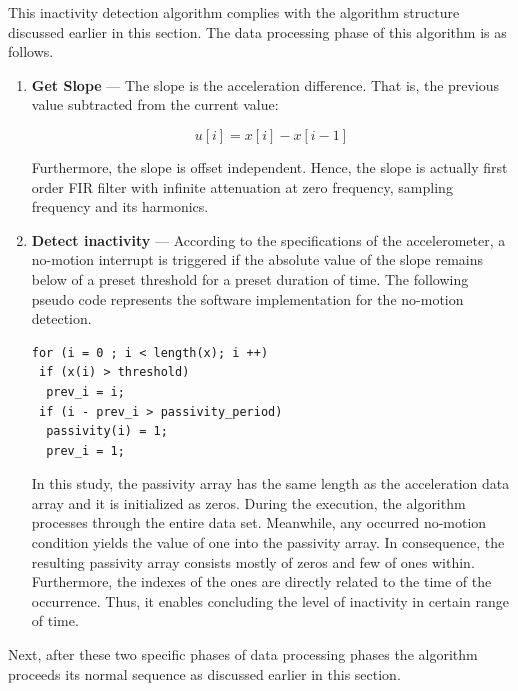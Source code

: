 \documentclass[english,12pt,a4paper,pdftex,elec,utf8]{aaltothesis}
\newcommand{\Clanguage}{\lstset{
  language=C++,                %
  basicstyle=\ttfamily,
  title=\lstname,                 %
}}
\begin{document}
This inactivity detection algorithm complies with the algorithm structure discussed earlier in this section. The data processing phase of this algorithm is as follows. \\

\begin{enumerate}
\item \textbf{Get Slope} --- The slope is the acceleration difference. That is, the previous value subtracted from the current value: 

\begin{equation}
u[i] = x[i] - x[i-1]
\end{equation}

Furthermore, the slope is offset independent. Hence, the slope is actually first order FIR filter with infinite attenuation at zero frequency, sampling frequency and its harmonics. \\

\item \textbf{Detect inactivity} --- According to the specifications of the accelerometer, a no-motion interrupt is triggered if the absolute value of the slope remains below of a preset threshold for a preset duration of time. The following pseudo code represents the software implementation for the no-motion detection. \\

\Clanguage
\begin{lstlisting}
for (i = 0 ; i < length(x); i ++)
 if (x(i) > threshold)	
  prev_i = i;
 if (i - prev_i > passivity_period)
  passivity(i) = 1;
  prev_i = 1;	
\end{lstlisting}

In this study, the passivity array has the same length as the acceleration data array and it is initialized as zeros. During the execution, the algorithm processes through the entire data set. Meanwhile, any occurred no-motion condition yields the value of one into the passivity array. In consequence, the resulting passivity array consists mostly of zeros and few of ones within. Furthermore, the indexes of the ones are directly related to the time of the occurrence. Thus, it enables concluding the level of inactivity in certain range of time. \\

\end{enumerate}

Next, after these two specific phases of data processing phases the algorithm proceeds its normal sequence as discussed earlier in this section. \\
\end{document}
